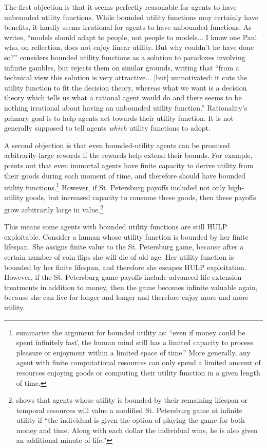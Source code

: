 \documentclass{article}
\begin{document}
The first objection is that it seems perfectly reasonable for agents to have unbounded utility functions. While bounded utility functions may certainly have benefits, it hardly seems irrational for agents to have unbounded functions. As \citet[pg. 26]{samuelson1977st} writes, ``models should adapt to people, not people to models... I know one Paul who, on reflection, does not enjoy linear utility. But why couldn't he have done so?'' \citet[pg. 496]{smith2014evaluative} considers bounded utility functions as a solution to paradoxes involving infinite gambles, but rejects them on similar grounds, writing that ``from a technical view this solution is very attractive... [but] unmotivated: it cuts the utility function to fit the decision theory, whereas what we want is a decision theory which tells us what a rational agent would do \textemdash{} and there seems to be nothing irrational about having an unbounded utility function.'' Rationality's primary goal is to help agents act towards their utility function. It is not generally supposed to tell agents \textit{which} utility functions to adopt.

A second objection is that even bounded-utility agents can be promised arbitrarily-large rewards if the rewards help extend their bounds. For example, \citet{brito1975becker} points out that even immortal agents have finite capacity to derive utility from their goods during each moment of time, and therefore should have bounded utility functions.\footnote{\citet{cowen1988time} summarise the argument for bounded utility as: ``even if money could be spent \'infinitely fast\', the human mind still has a limited capacity to process pleasure or enjoyment within a limited space of time.'' More generally, any agent with finite computational resources can only spend a limited amount of resources enjoying goods or computing their utility function in a given length of time.} However, if St. Petersburg payoffs included not only high-utility goods, but increased capacity to consume these goods, then these payoffs grow arbitrarily large in value.\footnote{\citet{cowen1988time} shows that agents whose utility is bounded by their remaining lifespan or temporal resources will value a modified St. Petersburg game at infinite utility if ``the individual is given the option of playing the game for both money and time. Along with each dollar the individual wins, he is also given an additional minute of life.''}

This means some agents with bounded utility functions are still HULP exploitable. Consider a human whose utility function is bounded by her finite lifespan. She assigns finite value to the St. Petersburg game, because after a certain number of coin flips she will die of old age. Her utility function is bounded by her finite lifespan, and therefore she escapes HULP exploitation. However, if the St. Petersburg game payoffs include advanced life extension treatments in addition to money, then the game becomes infinite valuable again, because she can live for longer and longer and therefore enjoy more and more utility.
\end{document}
